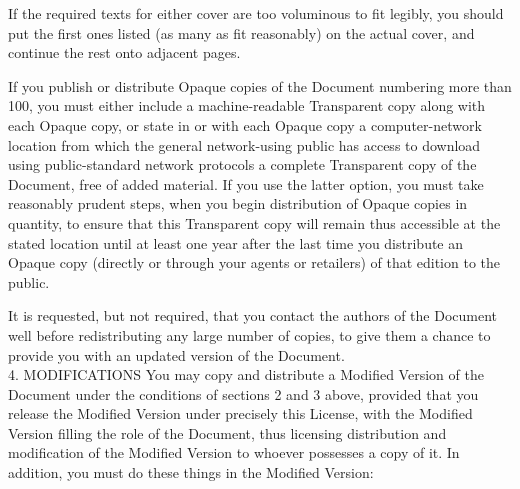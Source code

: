 \documentclass[10pt,a4paper]{article}
\begin{document}
\begin{scriptsize}
If the required texts for either cover are too voluminous to fit legibly, you should put the first ones listed (as many as fit reasonably) on the actual cover, and continue the rest onto adjacent pages.

If you publish or distribute Opaque copies of the Document numbering more than 100, you must either include a machine-readable Transparent copy along with each Opaque copy, or state in or with each Opaque copy a computer-network location from which the general network-using public has access to download using public-standard network protocols a complete Transparent copy of the Document, free of added material. If you use the latter option, you must take reasonably prudent steps, when you begin distribution of Opaque copies in quantity, to ensure that this Transparent copy will remain thus accessible at the stated location until at least one year after the last time you distribute an Opaque copy (directly or through your agents or retailers) of that edition to the public.

It is requested, but not required, that you contact the authors of the Document well before redistributing any large number of copies, to give them a chance to provide you with an updated version of the Document.\\

4. MODIFICATIONS
You may copy and distribute a Modified Version of the Document under the conditions of sections 2 and 3 above, provided that you release the Modified Version under precisely this License, with the Modified Version filling the role of the Document, thus licensing distribution and modification of the Modified Version to whoever possesses a copy of it. In addition, you must do these things in the Modified Version:


\end{scriptsize}
\end{document}
